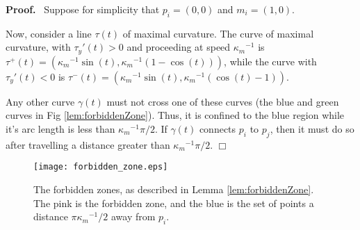 \documentclass{article}
\newenvironment{proof}{
  \noindent\textbf{Proof.}\ }{\hspace*{\fill}
  \begin{math}\Box\end{math}\medskip}
\numberwithin{cntr}{section}
\newcommand{\kmax}{{\kappa_{m}}}
\newcommand{\kmaxi}{{\kmax^{-1}}}
\begin{document}
\begin{proof}
  Suppose for simplicity that $p_{i}=(0,0)$ and $m_{i}=(1,0)$.

  Now, consider a line $\tau(t)$ of maximal curvature. The curve of maximal curvature, with $\tau_{y}'(t) > 0$ and proceeding at speed $\kmaxi$ is $\tau^{+}(t)=(\kmaxi \sin(t), \kmaxi (1-\cos(t)))$, while the curve with $\tau_{y}'(t) < 0$ is $\tau^{-}(t)=(\kmaxi \sin(t), \kmaxi (\cos(t)-1))$.

Any other curve $\gamma(t)$ must not cross one of these curves (the blue and green curves in Fig \ref{lem:forbiddenZone}). Thus, it is confined to the blue region while it's arc length is less than $\kmaxi \pi/2$. If $\gamma(t)$ connects $p_{i}$ to $p_{j}$, then it must do so after travelling a distance greater than $\kmaxi \pi/2$.
\end{proof}

\begin{figure}
\setlength{\unitlength}{0.240900pt}
\ifx\plotpoint\undefined\newsavebox{\plotpoint}\fi
\sbox{\plotpoint}{\rule[-0.200pt]{0.400pt}{0.400pt}}%
\texttt{[image: forbidden\_zone.eps]}

\caption{The forbidden zones, as described in Lemma \ref{lem:forbiddenZone}. The pink is the forbidden zone, and the blue is the set of points a distance $\pi \kmaxi/2$ away from $p_{i}$.}
\label{fig:forbiddenZone}
\end{figure}





\end{document}
